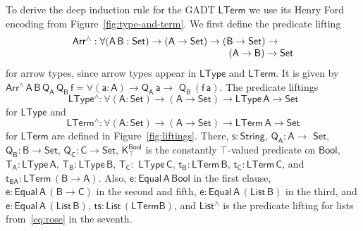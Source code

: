 \documentclass[sigplan,10pt,anonymous,review]{acmart}
\begin{document}
To derive the deep induction rule for the GADT $\mathsf{LTerm}$ we use
its Henry Ford encoding from Figure~\ref{fig:type-and-term}.
We first define the predicate lifting
\[\begin{array}{l}
\mathsf{Arr^{\wedge} : \forall (A\, B : Set) \to (A \to Set) \to (B
  \to Set) \to}\\
\mathsf{\hspace*{2.2in}(A \to B) \to Set}
\end{array}\] for arrow types, since arrow types
appear in $\mathsf{LType}$ and $\mathsf{LTerm}$.  It is given by
$\mathsf{Arr^{\wedge}\, A\, B\, Q_A\, Q_B\, f = \forall (a : A) \to
  Q_A\,a \to}$ $\mathsf{Q_B\, (f\,a)}$. The predicate liftings
\[\mathsf{LType^{\wedge} : \forall (A : Set) \to (A \to Set) \to
  LType\,A \to Set}\] for $\mathsf{LType}$ and
\[\mathsf{LTerm^{\wedge}
  : \forall (A : Set) \to (A \to Set) \to LTerm\,A \to Set}\] for
$\mathsf{LTerm}$ are defined in Figure~\ref{fig:liftings}.  There,
$\mathsf{s : String}$, $\mathsf{Q_A : A \to}$ $\mathsf{Set}$,
$\mathsf{Q_B : B \to Set}$, $\mathsf{Q_C : C \to Set}$,
$\mathsf{K^{Bool}_{\top}}$ is the constantly $\mathsf{\top}$-valued
predicate on $\mathsf{Bool}$, $\mathsf{T_A : LType\, A}$, $\mathsf{T_B
  : LType \,B}$, $\mathsf{T_C :}$ $\mathsf{LType \,C}$, $\mathsf{t_B :
  LTerm \, B}$, $\mathsf{t_C : LTerm \, C}$, and $\mathsf{t_{BA} :
  LTerm \, (B \to A)}$.  Also, $\mathsf{e : Equal\,A\,Bool}$ in the
first clause, $\mathsf{e : Equal\, A\, (B \to C)}$ in the second and
fifth, $\mathsf{e : Equal\, A\, (List\, B)}$ in the third,
and $\mathsf{e : Equal\, A\, (List \,B)}$,
$\mathsf{ts : List\, (LTerm B)}$, and $\mathsf{List^\wedge}$ is the
predicate lifting for lists from~\eqref{eq:rose} in the seventh.
\end{document}
